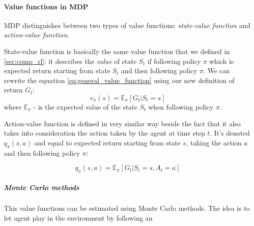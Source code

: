 \paragraph{Value functions in MDP} MDP distinguishes between two types of value functions:
\emph{state-value function} and \emph{action-value function}.

State-value function is basically the same value function that we defined in \autoref{sec:comp_rl}:
it describes the \emph{value} of state $S_t$ if following policy $\pi$ which is expected return
starting from state $S_t$ and then following policy $\pi$. We can rewrite the equation \ref{eq:general_value_function}
using our new definition of return $G_t$:
\begin{equation} \label{eq:value_state}
	v_{\pi}(s) = \mathbb{E}_{\pi} [G_t |S_t = s]
\end{equation}
where $\mathbb{E}_{\pi}$ - is the expected value of the state $S_t$ when
following policy $\pi$.

Action-value function is defined in very similar way beside the fact that it also takes
into consideration the action taken by the agent at time step $t$. It's denoted $q_{\pi}(s, a)$
and equal to expected return starting from state $s$, taking the action $a$ and then following
policy $\pi$:

\begin{equation} \label{eq:action_value_func}
	q_{\pi}(s, a) = \mathbb{E}_{\pi} [G_t |S_t = s, A_t = a]
\end{equation}

\subparagraph{Monte Carlo methods}

This value functions can be estimated using Monte Carlo methods.
The idea is to let agent play in the environment by following an



